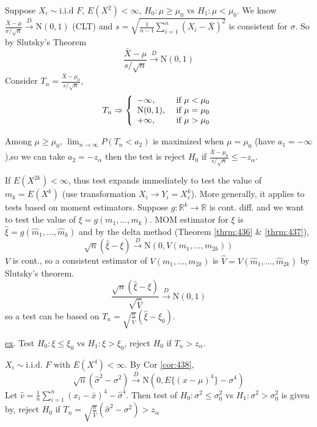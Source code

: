 \documentclass[english, 11pt]{article}
\newcommand{\lp}{\left(}
\newcommand{\rp}{\right)}
\begin{document}
\begin{exmp}\label{exmp:528}
Suppose $X_i\sim \text{i.i.d }F$, $E(X^2)<\infty$, $H_0:\mu\geqslant \mu_0$ vs $ H_1:\mu<\mu_0$. We know $\frac{\bar{X}-\mu}{\sigma/\sqrt{n}}\xrightarrow{D}\text{N}(0, 1)$ (CLT) and $s=\sqrt{\frac{1}{n-1}\sum_{i=1}^n(X_i-\bar{X})^2}$ is consistent for $\sigma$. So by Slutsky's Theorem
$$
\frac{\bar{X}-\mu}{s/\sqrt{n}}\xrightarrow{D}\text{N}(0, 1)
$$
Consider $T_n=\frac{\bar{X}-\mu_0}{s/\sqrt{n}}$, 
$$
T_n\Rightarrow\left\{
\begin{array}{l l}
-\infty, & \text{ if }\mu<\mu_0\\
\text{N}(0, 1), &\text{ if }\mu=\mu_0\\
+\infty, &\text{ if }\mu>\mu_0
\end{array}\right.
$$

Among $\mu\geqslant\mu_0$, $\lim_{n\to\infty}P(T_n<a_2)$ is maximized when $\mu=\mu_0$ (have $a_1=-\infty$),so we can take $a_2=-z_\alpha$ then the test is reject $H_0$ if $\frac{\bar{X}-\mu_0}{s/\sqrt{n}}\leqslant-z_\alpha$. 

If $E(X^{2k})<\infty$, thus test expands immediately to test the value of $m_k=E(X^k)$ (use transformation $X_i\to Y_i=X_i^k$). More generally, it applies to tests based on moment estimators. Suppose $g:\mathbb{R}^k\to \mathbb{R}$ is cont. diff. and we want to test the value of $\xi=g(m_1, \dots, m_k)$. MOM estimator for $\xi$ is $\hat{\xi}=g(\hat{m}_1, \dots, \hat{m}_k)$ and by the delta method (Theorem \ref{thrm:436} \& \ref{thrm:437}), 
$$
\sqrt{n}(\hat{\xi}-\xi)\xrightarrow{D}\text{N}(0, V(m_1, \dots, m_{2k}))
$$
$V$ is cont., so a consistent estimator of $V(m_1, \dots, m_{2k})$ is $\hat{V}=V(\hat{m}_1, \dots, \hat{m}_{2k})$ by Slutsky's theorem.
$$
\frac{\sqrt{n}(\hat{\xi}-\xi)}{\sqrt{\hat{V}}}\xrightarrow{D}\text{N}(0, 1)
$$
so a test can be based on $T_n=\sqrt{\frac{n}{\hat{V}}}(\hat{\xi}-\xi_0)$.
\end{exmp}

\underline{ex}. Test $H_0:\xi\leq\xi_0$ vs $H_1:\xi>\xi_0$, reject $H_0$ if $T_n>z_\alpha$.

\begin{exmp}\label{exmp:529}
$X_i\sim \text{i.i.d. $F$ with }E(X^4)<\infty$. By Cor \ref{cor:438}, 
$$
\sqrt{n}(\hat{\sigma}^2-\sigma^2)\xrightarrow{D}\text{N}(0, E\{(x-\mu)^4\}-\sigma^4)
$$
Let $\hat{v}=\frac{1}{n}\sum_{i=1}^n(x_i-\bar{x})^4-\hat{\sigma}^4$. Then test of $H_0:\sigma^2\leqslant\sigma_0^2$ vs $H_1:\sigma^2>\sigma_0^2$ is given by, reject $H_0$ if $T_n=\sqrt{\frac{n}{\hat{V}}}\lp\hat{\sigma}^2-\sigma^2\rp>z_\alpha$
\end{exmp}
\end{document}
